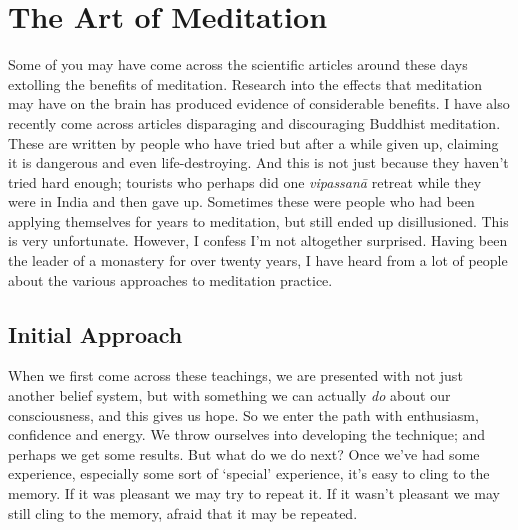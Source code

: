 
\chapter{The Art of Meditation}


Some of you may have come across the scientific articles around these
days extolling the benefits of meditation. Research into the effects
that meditation may have on the brain has produced evidence of
considerable benefits. I have also recently come across articles
disparaging and discouraging Buddhist meditation. These are written by
people who have tried but after a while given up, claiming it is
dangerous and even life-destroying. And this is not just because they
haven’t tried hard enough; tourists who perhaps did one \emph{vipassanā}
retreat while they were in India and then gave up. Sometimes these were
people who had been applying themselves for years to meditation, but
still ended up disillusioned. This is very unfortunate. However, I
confess I’m not altogether surprised. Having been the leader of a
monastery for over twenty years, I have heard from a lot of people about
the various approaches to meditation practice.

\section{Initial Approach}

When we first come across these teachings, we are presented with not
just another belief system, but with something we can actually \emph{do}
about our consciousness, and this gives us hope. So we enter the path
with enthusiasm, confidence and energy. We throw ourselves into
developing the technique; and perhaps we get some results. But what do
we do next? Once we’ve had some experience, especially some sort of
‘special’ experience, it’s easy to cling to the memory. If it was
pleasant we may try to repeat it. If it wasn’t pleasant we may still
cling to the memory, afraid that it may be repeated.

